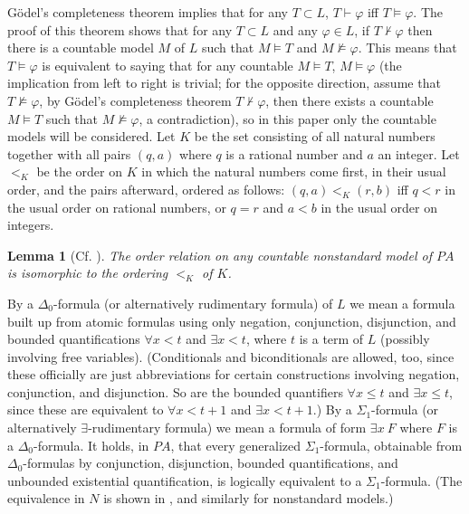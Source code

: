 \documentclass[a4paper,11pt]{article}
\begin{document}
G\"{o}del's completeness theorem implies that for any $T\subset L$, $T\vdash \varphi$ iff $T\models \varphi$. The proof of this theorem shows that for any $T \subset L$ and any $\varphi\in L$, if $T\nvdash \varphi$ then there is a countable model $M$ of $L$ such that $M\models T$ and $M \nvDash \varphi$. This means that $T\models \varphi$ is equivalent to saying that for any countable $M\models T$, $M\models \varphi$ (the implication from left to right is trivial; for the opposite direction, assume that $T\nvDash \varphi$, by G\"{o}del's completeness theorem $T \nvdash \varphi$, then there exists a countable $M\models T$ such that $M\nvDash \varphi$, a contradiction), so in this paper only the countable models will be considered. Let $K$ be the set consisting of all natural numbers together with all pairs $(q,a)$ where $q$ is a rational number and $a$ an integer. Let $<_K$ be the order on $K$ in which the natural numbers come first, in their usual order, and the pairs afterward, ordered as follows: $(q,a) <_K (r,b)$ iff $q<r$ in the usual order on rational numbers, or $q=r$ and $a<b$ in the usual order on integers.
\newtheorem{order_relation_in_nonstandard_models}{Lemma}[subsection]
\begin{order_relation_in_nonstandard_models}[{Cf. \cite[p304]{c. and l.}}]\label{order_relation_in_nonstandard_models}
  The order relation on any countable nonstandard model of $PA$ is isomorphic to the ordering $<_K$ of $K$.
\end{order_relation_in_nonstandard_models}

By a $\Delta_0$-formula (or alternatively rudimentary formula) of $L$ we mean a formula built up from atomic formulas using only negation, conjunction, disjunction, and bounded quantifications $\forall x<t$ and $\exists x<t$, where $t$ is a term of $L$ (possibly involving free variables). (Conditionals and biconditionals are allowed, too, since these officially are just abbreviations for certain constructions involving negation, conjunction, and disjunction. So are the bounded quantifiers $\forall x\leq t$ and $\exists x\leq t$, since these are equivalent to $\forall x<t+1$ and $\exists x<t+1$.) By a $\Sigma_1$-formula (or alternatively $\exists$-rudimentary formula) we mean a formula of form $\exists x\ F$ where $F$ is a $\Delta_0$-formula. It holds, in $PA$, that every generalized $\Sigma_1$-formula, obtainable from $\Delta_0$-formulas by conjunction, disjunction, bounded quantifications, and unbounded existential quantification, is logically equivalent to a $\Sigma_1$-formula. (The equivalence in $N$ is shown in \cite[Proposition 16.10]{c. and l.}, and similarly for nonstandard models.)
\end{document}
